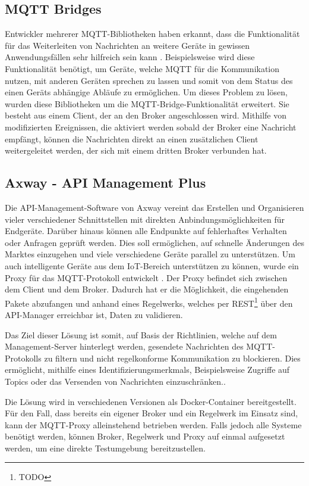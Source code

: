     \subsection{MQTT Bridges}
        Entwickler mehrerer MQTT-Bibliotheken haben erkannt, dass die Funktionalität für das Weiterleiten von Nachrichten an weitere Geräte in gewissen Anwendungsfällen sehr hilfreich sein kann \cite{84codes_ab_2016} \cite{light_2019}. Beispielsweise wird diese Funktionalität benötigt, um Geräte, welche \ac{MQTT} für die Kommunikation nutzen, mit anderen Geräten sprechen zu lassen und somit von dem Status des einen Geräts abhängige Abläufe zu ermöglichen.
        Um dieses Problem zu lösen, wurden diese Bibliotheken um die MQTT-Bridge-Funktionalität erweitert. Sie besteht aus einem Client, der an den Broker angeschlossen wird. Mithilfe von modifizierten Ereignissen, die aktiviert werden sobald der Broker eine Nachricht empfängt, können die Nachrichten direkt an einen zusätzlichen Client weitergeleitet werden, der sich mit einem dritten Broker verbunden hat.
    
    \subsection{Axway - API Management Plus}
        Die API-Management-Software von Axway vereint das Erstellen und Organisieren vieler verschiedener Schnittstellen mit direkten Anbindungsmöglichkeiten für Endgeräte. Darüber hinaus können alle Endpunkte auf fehlerhaftes Verhalten oder Anfragen geprüft werden. Dies soll ermöglichen, auf schnelle Änderungen des Marktes einzugehen und viele verschiedene Geräte parallel zu unterstützen.
        Um auch intelligente Geräte aus dem \ac{IoT}-Bereich unterstützen zu können, wurde ein Proxy für das \ac{MQTT}-Protokoll entwickelt \cite{axway_2018}. Der Proxy befindet sich zwischen dem Client und dem Broker. Dadurch hat er die Möglichkeit, die eingehenden Pakete abzufangen und anhand eines Regelwerks, welches per \ac{REST}\footnote{TODO} über den API-Manager erreichbar ist, Daten zu validieren.
        
        Das Ziel dieser Lösung ist somit, auf Basis der Richtlinien, welche auf dem Management-Server hinterlegt werden, gesendete Nachrichten des \ac{MQTT}-Protokolls zu filtern und nicht regelkonforme Kommunikation zu blockieren. Dies ermöglicht, mithilfe eines Identifizierungsmerkmals, Beispielsweise Zugriffe auf Topics oder das Versenden von Nachrichten einzuschränken..
        
        Die Lösung wird in verschiedenen Versionen als Docker-Container bereitgestellt. Für den Fall, dass bereits ein eigener Broker und ein Regelwerk im Einsatz sind, kann der \ac{MQTT}-Proxy alleinstehend betrieben werden. Falls jedoch alle Systeme benötigt werden, können Broker, Regelwerk und Proxy auf einmal aufgesetzt werden, um eine direkte Testumgebung bereitzustellen.
        
